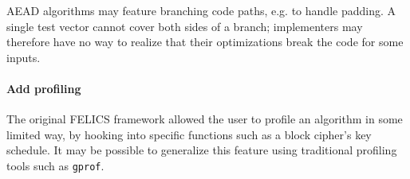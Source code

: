 \documentclass{article}
\begin{document}
AEAD algorithms may feature branching code paths, e.g. to handle
padding.  A single test vector cannot cover both sides of a branch;
implementers may therefore have no way to realize that their
optimizations break the code for some inputs.

\paragraph{Add profiling}

The original FELICS framework allowed the user to profile an algorithm
in some limited way, by hooking into specific functions such as a
block cipher's key schedule.  It may be possible to generalize this
feature using traditional profiling tools such as \texttt{gprof}.



\end{document}
